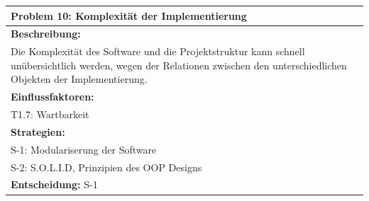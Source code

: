 \documentclass[fontsize=12pt,paper=a4,twoside]{scrartcl}
\begin{document}
\begin{longtable}{|p{15cm}|}
\hline
Problem 10: Komplexität der Implementierung                                                                       
\\ \hline                                                                                                                                                                                                                                                                                                                                                                                                                                                                                                                                                        
\textbf{Beschreibung:} \\
Die Komplexität des Software und die Projektstruktur kann schnell unübersichtlich werden, wegen der Relationen zwischen den unterschiedlichen Objekten der Implementierung.
\\ \hline
\textbf{Einflussfaktoren:} \\
T1.7: Wartbarkeit
\\ \hline
\textbf{Strategien:} \\
S-1: Modulariserung der Software \\
S-2: S.O.L.I.D, Prinzipien des OOP Designs
 \\ \hline
 \textbf{Entscheidung:} S-1
\\ \hline
\end{longtable}
\end{document}
